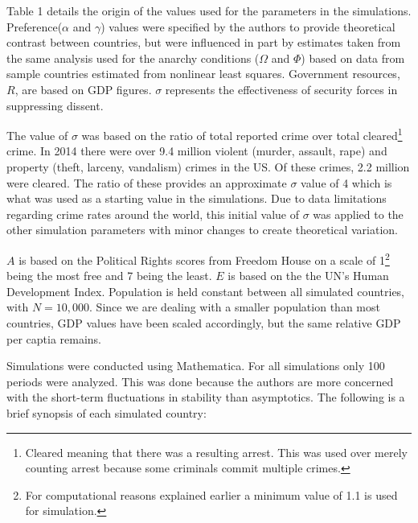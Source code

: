 \documentclass[12pt]{article}
\begin{document}
\begin{spacing}{1.5}
Table 1 details the origin of the values used for the parameters in the simulations. Preference($\alpha$ and $\gamma$) values were specified by the authors to provide theoretical contrast between countries, but were influenced in part by estimates taken from the same analysis used for the anarchy conditions ($\Omega$ and $\Phi$) based on data from sample countries estimated from nonlinear least squares. Government resources, $R$, are based on GDP figures. $\sigma$ represents the effectiveness of security forces in suppressing dissent. 

The value of $\sigma$ was based on the ratio of total reported crime over total cleared\footnote{Cleared meaning that there was a resulting arrest. This was used over merely counting arrest because some criminals commit multiple crimes.} crime. In 2014 there were over 9.4 million violent (murder, assault, rape) and property (theft, larceny, vandalism) crimes in the US. Of these crimes, 2.2 million were cleared. The ratio of these provides an approximate $\sigma$ value of 4 which is what was used as a starting value in the simulations. Due to data limitations regarding crime rates around the world, this initial value of $\sigma$ was applied to the other simulation parameters with minor changes to create theoretical variation. 

$A$ is based on the Political Rights scores from Freedom House on a scale of 1\footnote{For computational reasons explained earlier a minimum value of 1.1 is used for simulation.} being the most free and 7 being the least. $E$ is based on the the UN's Human Development Index. Population is held constant between all simulated countries, with $N=10,000$. Since we are dealing with a smaller population than most countries, GDP values have been scaled accordingly, but the same relative GDP per captia remains. 

Simulations were conducted using Mathematica. For all simulations only 100 periods were analyzed. This was done because the authors are more concerned with the short-term fluctuations in stability than asymptotics. The following is a brief synopsis of each simulated country:  




\end{spacing}
\end{document}
